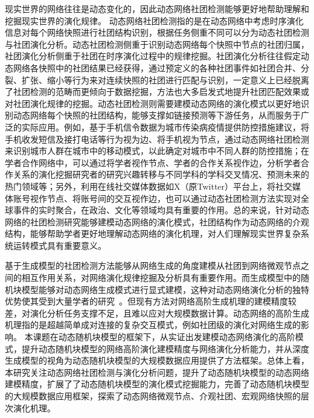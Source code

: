 现实世界的网络往往是动态变化的，因此动态网络社团检测能够更好地帮助理解和挖掘现实世界的演化规律。
动态网络社团检测指的是在动态网络中考虑时序演化信息对每个网络快照进行社团结构识别，根据任务侧重不同可以分为动态社团检测与社团演化分析。动态社团检测侧重于识别动态网络每个快照中节点的社团归属，社团演化分析侧重于社团在时序演化过程中的规律挖掘。社团演化分析往往假定动态网络各快照中的社团结果已经获得，通过预定义的各种社团事件如社团合并、分裂、扩张、缩小等行为\cite{palla2007quantifying}来对连续快照的社团进行匹配与识别，一定意义上已经脱离了社团检测的范畴而更倾向于数据挖掘，方法也大多启发式地提升社团匹配效果或对社团演化规律的挖掘。动态社团检测则需要建模动态网络的演化模式以更好地识别动态网络每个快照的社团结构，能够支撑如链接预测等下游任务，从而服务于广泛的实际应用\cite{farajtabar2017coevolve,kumar2024community}。例如，基于手机信令数据为城市传染病疫情提供防控措施建议\cite{he2024urban}，将手机收发短信及接打电话等行为视为边、将手机视为节点，通过动态网络社团检测来识别城市人群在城市中的移动模式，以此确定对城市中不同人群的防控措施；在学者合作网络中，可以通过将学者视作节点、学者的合作关系视作边，分析学者合作关系的演化挖掘研究者的研究兴趣转移与不同学科的学科交叉情况、预测未来的热门领域等\cite{mariani2024collective,wang2022weak}；另外，利用在线社交媒体数据如X（原Twitter）平台上，将社交媒体账号视作节点、将账号间的交互视作边，也可以通过动态社团检测方法实现对全球事件的实时聚合，在政治、文化等领域均具有重要的作用\cite{ma2024knowledge}。总的来说，针对动态网络的社团检测研究能够建模动态网络的演化模式，社团结构作为动态网络的介观结构，能够帮助学者更好地理解动态网络的演化机理，对人们理解现实世界复杂系统运转模式具有重要意义。

基于生成模型的社团检测方法能够从网络生成的角度建模从社团到网络微观节点之间的相互作用关系，对网络演化规律挖掘及分析具有重要作用。而生成模型中的随机块模型能够对动态网络生成模式进行显式建模，这种对动态网络演化分析的独特优势使其受到大量学者的研究~\cite{LI2024128169}。但现有方法对网络高阶生成机理的建模精度较差，对演化分析任务支撑不足，且难以应对大规模数据计算。动态网络的高阶生成机理指的是超越简单成对连接的复杂交互模式，例如社团级的演化对网络生成的影响。
本课题在动态随机块模型的框架下，从实证出发建模动态网络演化的高阶模式，提升动态随机块模型的网络高阶演化建模精度与网络演化分析能力，并从深度生成模型的视角为动态随机块模型的大规模数据应用提供了方法框架。总体上看，本研究关注动态网络社团检测与演化分析问题，提升了动态随机块模型的动态网络建模精度，扩展了了动态随机块模型的演化模式挖掘能力，完善了动态随机块模型的大规模数据应用框架，探索了动态网络微观节点、介观社团、宏观网络快照的层次演化机理。





